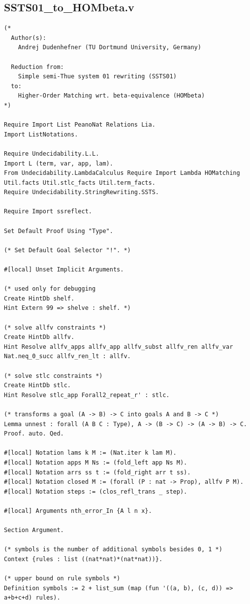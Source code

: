 \subsection*{SSTS01\_to\_HOMbeta.v}
\begin{lstlisting}
(*
  Author(s):
    Andrej Dudenhefner (TU Dortmund University, Germany)

  Reduction from:
    Simple semi-Thue system 01 rewriting (SSTS01)
  to:
    Higher-Order Matching wrt. beta-equivalence (HOMbeta)
*)

Require Import List PeanoNat Relations Lia.
Import ListNotations.

Require Undecidability.L.L.
Import L (term, var, app, lam).
From Undecidability.LambdaCalculus Require Import Lambda HOMatching Util.facts Util.stlc_facts Util.term_facts.
Require Undecidability.StringRewriting.SSTS.

Require Import ssreflect.

Set Default Proof Using "Type".

(* Set Default Goal Selector "!". *)

#[local] Unset Implicit Arguments.

(* used only for debugging 
Create HintDb shelf.
Hint Extern 99 => shelve : shelf. *)

(* solve allfv constraints *)
Create HintDb allfv.
Hint Resolve allfv_apps allfv_app allfv_subst allfv_ren allfv_var Nat.neq_0_succ allfv_ren_lt : allfv.

(* solve stlc constraints *)
Create HintDb stlc.
Hint Resolve stlc_app Forall2_repeat_r' : stlc.

(* transforms a goal (A -> B) -> C into goals A and B -> C *)
Lemma unnest : forall (A B C : Type), A -> (B -> C) -> (A -> B) -> C.
Proof. auto. Qed.

#[local] Notation lams k M := (Nat.iter k lam M).
#[local] Notation apps M Ns := (fold_left app Ns M).
#[local] Notation arrs ss t := (fold_right arr t ss).
#[local] Notation closed M := (forall (P : nat -> Prop), allfv P M).
#[local] Notation steps := (clos_refl_trans _ step).

#[local] Arguments nth_error_In {A l n x}.

Section Argument.

(* symbols is the number of additional symbols besides 0, 1 *)
Context {rules : list ((nat*nat)*(nat*nat))}.

(* upper bound on rule symbols *)
Definition symbols := 2 + list_sum (map (fun '((a, b), (c, d)) => a+b+c+d) rules).


\end{lstlisting}
